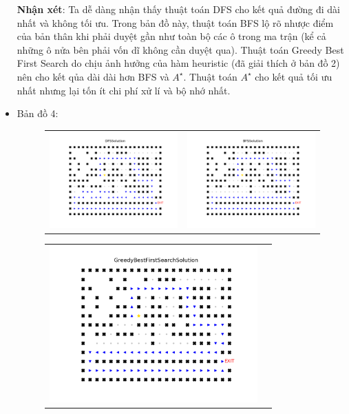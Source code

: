 \documentclass[11pt]{article} %
\begin{document}
\begin{itemize}
	\textbf{Nhận xét}: Ta dễ dàng nhận thấy thuật toán DFS cho kết quả đường đi dài nhất và không tối ưu. Trong bản đồ này, thuật toán BFS lộ rõ nhược điểm của bản thân khi phải duyệt gần như toàn bộ các ô trong ma trận (kể cả những ô nửa bên phải vốn dĩ không cần duyệt qua). Thuật toán Greedy Best First Search do chịu ảnh hưởng của hàm heuristic (đã giải thích ở bản đồ 2) nên cho kết qủa dài dài hơn BFS và $A^{\star}$. Thuật toán  $A^{\star}$ cho kết quả tối ưu nhất nhưng lại tốn ít chi phí xử lí và bộ nhớ nhất.
	
	
	\newpage
	\item Bản đồ 4:
	\begin{figure}[h] \label{bd4}
		\centering
		\begin{tabular}{cc}
			\includegraphics[width=8cm]{Figures/fg4_dfs.png} &
			\includegraphics[width=8cm]{Figures/fg4_bfs.png} \\
		\end{tabular}
	\end{figure}
	\begin{figure}[h] \label{Hình 4}
		\centering
		\begin{tabular}{cc}
			\includegraphics[width=8cm]{Figures/fg4_gbfs.png} &

\end{tabular}
\end{figure}
\end{itemize}
\end{document}
